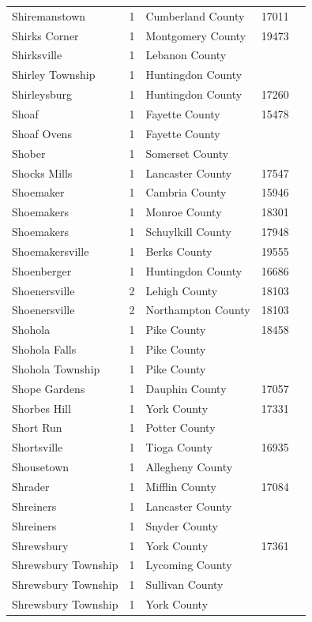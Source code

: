 \documentclass{article}
\begin{document}
\begin{tabular}{lllll}
Shiremanstown & 1 & Cumberland County & 17011 &  \\
Shirks Corner & 1 & Montgomery County & 19473 &  \\
Shirksville & 1 & Lebanon County &  &  \\
Shirley Township & 1 & Huntingdon County &  &  \\
Shirleysburg & 1 & Huntingdon County & 17260 &  \\
Shoaf & 1 & Fayette County & 15478 &  \\
Shoaf Ovens & 1 & Fayette County &  &  \\
Shober & 1 & Somerset County &  &  \\
Shocks Mills & 1 & Lancaster County & 17547 &  \\
Shoemaker & 1 & Cambria County & 15946 &  \\
Shoemakers & 1 & Monroe County & 18301 &  \\
Shoemakers & 1 & Schuylkill County & 17948 &  \\
Shoemakersville & 1 & Berks County & 19555 &  \\
Shoenberger & 1 & Huntingdon County & 16686 &  \\
Shoenersville & 2 & Lehigh County & 18103 &  \\
Shoenersville & 2 & Northampton County & 18103 &  \\
Shohola & 1 & Pike County & 18458 &  \\
Shohola Falls & 1 & Pike County &  &  \\
Shohola Township & 1 & Pike County &  &  \\
Shope Gardens & 1 & Dauphin County & 17057 &  \\
Shorbes Hill & 1 & York County & 17331 &  \\
Short Run & 1 & Potter County &  &  \\
Shortsville & 1 & Tioga County & 16935 &  \\
Shousetown & 1 & Allegheny County &  &  \\
Shrader & 1 & Mifflin County & 17084 &  \\
Shreiners & 1 & Lancaster County &  &  \\
Shreiners & 1 & Snyder County &  &  \\
Shrewsbury & 1 & York County & 17361 &  \\
Shrewsbury Township & 1 & Lycoming County &  &  \\
Shrewsbury Township & 1 & Sullivan County &  &  \\
Shrewsbury Township & 1 & York County &  &  \\

\end{tabular}
\end{document}
